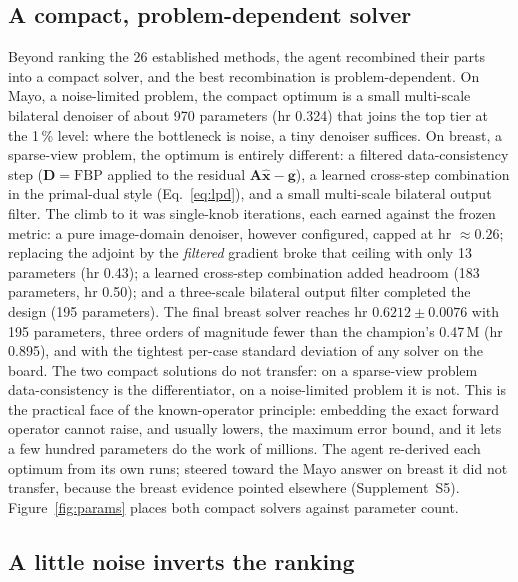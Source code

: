 \documentclass[AMA,twocolumn]{USG} %
\begin{document}
\subsection{A compact, problem-dependent solver}\label{sec:compact}

Beyond ranking the 26 established methods, the agent recombined their parts into a compact solver, and the best recombination is problem-dependent. On Mayo, a noise-limited problem, the compact optimum is a small multi-scale bilateral denoiser of about 970 parameters (hr 0.324) that joins the top tier at the 1\,\% level: where the bottleneck is noise, a tiny denoiser suffices. On breast, a sparse-view problem, the optimum is entirely different: a filtered data-consistency step ($\mathbf{D}=\mathrm{FBP}$ applied to the residual $\mathbf{A}\hat{\mathbf{x}}-\mathbf{g}$), a learned cross-step combination in the primal-dual style (Eq.~\ref{eq:lpd}), and a small multi-scale bilateral output filter. The climb to it was single-knob iterations, each earned against the frozen metric: a pure image-domain denoiser, however configured, capped at hr $\approx0.26$; replacing the adjoint by the \emph{filtered} gradient broke that ceiling with only 13 parameters (hr 0.43); a learned cross-step combination added headroom (183 parameters, hr 0.50); and a three-scale bilateral output filter completed the design (195 parameters). The final breast solver reaches hr $0.6212\pm0.0076$ with 195 parameters, three orders of magnitude fewer than the champion's 0.47\,M (hr 0.895), and with the tightest per-case standard deviation of any solver on the board. The two compact solutions do not transfer: on a sparse-view problem data-consistency is the differentiator, on a noise-limited problem it is not. This is the practical face of the known-operator principle: embedding the exact forward operator cannot raise, and usually lowers, the maximum error bound, and it lets a few hundred parameters do the work of millions.\cite{maier2019knownop} The agent re-derived each optimum from its own runs; steered toward the Mayo answer on breast it did not transfer, because the breast evidence pointed elsewhere (Supplement~S5). Figure~\ref{fig:params} places both compact solvers against parameter count.

\subsection{A little noise inverts the ranking}\label{sec:reversal}
\end{document}
